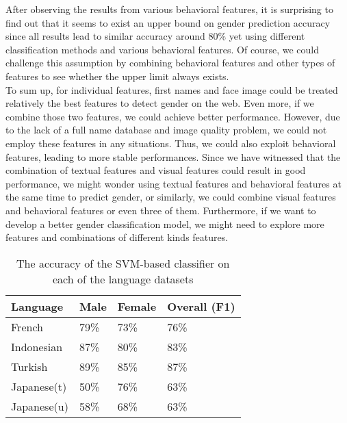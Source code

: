\documentclass[runningheads]{llncs}
\begin{document}
	After observing the results from various behavioral features, it is surprising to find out that it seems to exist an upper bound on gender prediction accuracy since all results lead to similar accuracy around 80\% yet using different classification methods and various behavioral features. Of course, we could challenge this assumption by combining behavioral features and other types of features to see whether the upper limit always exists. \\
	
	To sum up, for individual features, first names and face image could be treated relatively the best features to detect gender on the web. Even more, if we combine those two features, we could achieve better performance. However, due to the lack of a full name database and image quality problem, we could not employ these features in any situations. Thus, we could also exploit behavioral features, leading to more stable performances. Since we have witnessed that the combination of textual features and visual features could result in good performance, we might wonder using textual features and behavioral features at the same time to predict gender, or similarly, we could combine visual features and behavioral features or even three of them. Furthermore, if we want to develop a better gender classification model, we might need to explore more features and combinations of different kinds features.
	
	\begin{table}
		\centering
		\caption{The accuracy of the SVM-based classifier on each of the language datasets }
		\begin{tabular}{| x{2cm} | x{2cm} | x{2cm} | x{2cm} |}
			\hline
			Language  &  Male  & Female & Overall (F1)\\
			\hline
			French & 79\% & 73\% & 76\% \\
			Indonesian & 87\% & 80\% & 83\% \\
			Turkish & 89\% & 85\% & 87\% \\
			Japanese(t) & 50\% & 76\% & 63\% \\
			Japanese(u) & 58\% & 68\% & 63\% \\
			\hline
		\end{tabular}
		\label{table:language}
	\end{table}
	
	
	
	\newpage
	
	
	
	
\end{document}
